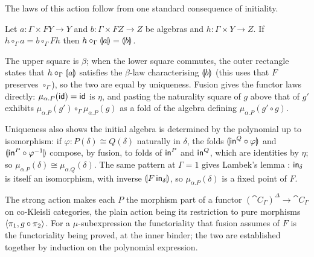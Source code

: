 The laws of this action follow from one standard consequence of initiality.

\begin{lemma}[Fusion]
\label{lem:polynomial-types:fusion}
Let $a : \Gamma \times FY \to Y$ and $b : \Gamma \times FZ \to Z$ be algebras and $h : \Gamma \times
Y \to Z$. If $h \circ_\Gamma a = b \circ_\Gamma Fh$ then $h \circ_\Gamma \llparenthesis a \rrparenthesis = \llparenthesis b \rrparenthesis$.
\end{lemma}
\begin{center}
\end{center}
\noindent
The upper square is $\beta$; when the lower square commutes, the outer rectangle states that
$h \circ_\Gamma \llparenthesis a \rrparenthesis$ satisfies the $\beta$-law characterising $\llparenthesis b \rrparenthesis$ (this uses that $F$
preserves $\circ_\Gamma$), so the two are equal by uniqueness. Fusion gives the functor laws directly:
$\mu_{\alpha.P}(\mathsf{id}) = \mathsf{id}$ is $\eta$, and pasting the naturality square of $g$ above that of $g'$
exhibits $\mu_{\alpha.P}(g') \circ_\Gamma \mu_{\alpha.P}(g)$ as a fold of the algebra defining
$\mu_{\alpha.P}(g' \circ g)$.

Uniqueness also shows the initial algebra is determined by the polynomial up to isomorphism:
if $\varphi : P(\delta) \cong Q(\delta)$ naturally in $\delta$, the folds
$\llparenthesis \mathsf{in}^Q \circ \varphi \rrparenthesis$ and $\llparenthesis \mathsf{in}^P \circ \varphi^{-1} \rrparenthesis$ compose, by fusion, to folds
of $\mathsf{in}^P$ and $\mathsf{in}^Q$, which are identities by $\eta$; so $\mu_{\alpha.P}(\delta) \cong
\mu_{\alpha.Q}(\delta)$. The same pattern at $\Gamma = 1$ gives Lambek's lemma \citep{lambek68}:
$\mathsf{in}_\delta$ is itself an isomorphism, with inverse $\llparenthesis F\,\mathsf{in}_\delta \rrparenthesis$, so
$\mu_{\alpha.P}(\delta)$ is a fixed point of $F$.

The strong action makes each $P$ the morphism part of a functor $(\cat{C}_\Gamma)^\Delta \to
\cat{C}_\Gamma$ on co-Kleisli categories, the plain action being its restriction to pure morphisms
$\langle \pi_1, g \circ \pi_2\rangle$. For a $\mu$-subexpression the functoriality that fusion assumes of
$F$ is the functoriality being proved, at the inner binder; the two are established together by
induction on the polynomial expression.



